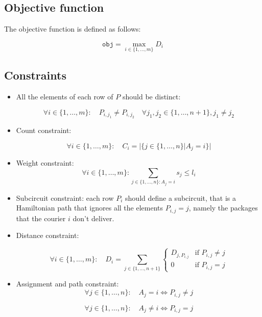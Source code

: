 \subsection{Objective function}
The objective function is defined as follows:

\[ \texttt{obj} = \max_{i \in \{1, \dots, m\}} D_i  \]

\subsection{Constraints}

\begin{itemize}
    \item All the elements of each row of $P$ should be distinct:

    \begin{equation}
        \forall i \in \{1, \dots, m\}: \quad P_{i,j_1} \neq P_{i,j_2} \quad \forall j_1,j_2 \in \{1, \dots, n+1\}, j_1 \neq j_2 
    \end{equation}

    \item Count constraint: 

    \begin{equation}
        \forall i \in \{ 1, \dots, m \}: \quad C_i = | \{ j \in \{1, \dots, n\} | A_j = i \}|
    \end{equation}


    \item Weight constraint: 
    \begin{equation}
        \forall i \in \{ 1, \dots, m \}: \sum_{j \in \{1, \dots, n\}: A_j = i} s_j \leq l_i 
    \end{equation}

    \item Subcircuit constraint: each row $P_i$ should define a subcircuit, that is a Hamiltonian path that ignores all the elements $P_{i,j} = j$, namely the packages that the courier $i$ don't deliver.

    \item Distance constraint:

    \begin{equation}
        \forall i \in \{1, \dots, m\}: \quad D_i = \sum_{j \in \{1, \dots, n+1\}} 
            \begin{cases}
                D_{j,P_{i,j}} & \text{if } P_{i,j} \neq j  \\
                0 & \text{if } P_{i,j} = j
            \end{cases}
    \end{equation}

    \item Assignment and path constraint:
    \begin{equation}
        \forall j \in \{1, \dots, n\}: \quad A_j = i \Longleftrightarrow P_{i,j} \neq j
    \end{equation}

    \begin{equation}
        \forall j \in \{1, \dots, n\}: \quad A_j \neq i \Longleftrightarrow P_{i,j} = j
    \end{equation}
\end{itemize}

